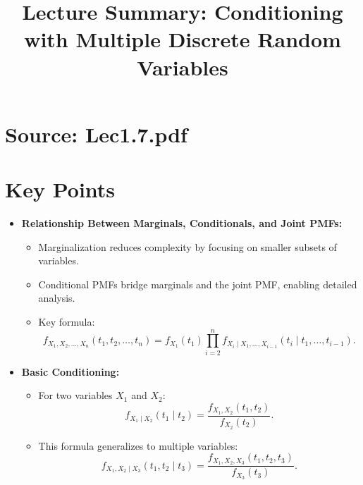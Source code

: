 \documentclass{article}
\title{Lecture Summary: Conditioning with Multiple Discrete Random Variables}
\author{}
\date{}
\begin{document}
\maketitle

\section*{Source: Lec1.7.pdf}

\section*{Key Points}

\begin{itemize}
  \item \textbf{Relationship Between Marginals, Conditionals, and Joint PMFs:}
    \begin{itemize}
      \item Marginalization reduces complexity by focusing on smaller subsets of variables.
      \item Conditional PMFs bridge marginals and the joint PMF, enabling detailed analysis.
      \item Key formula:
        \[
          f_{X_1, X_2, \dots, X_n}(t_1, t_2, \dots, t_n) = f_{X_1}(t_1) \prod_{i=2}^n f_{X_i \mid X_1, \dots, X_{i-1}}(t_i \mid t_1, \dots, t_{i-1}).
        \]
    \end{itemize}

  \item \textbf{Basic Conditioning:}
    \begin{itemize}
      \item For two variables $X_1$ and $X_2$:
        \[
          f_{X_1 \mid X_2}(t_1 \mid t_2) = \frac{f_{X_1, X_2}(t_1, t_2)}{f_{X_2}(t_2)}.
        \]
      \item This formula generalizes to multiple variables:
        \[
          f_{X_1, X_2 \mid X_3}(t_1, t_2 \mid t_3) = \frac{f_{X_1, X_2, X_3}(t_1, t_2, t_3)}{f_{X_3}(t_3)}.
        \]
    \end{itemize}


\end{itemize}
\end{document}
